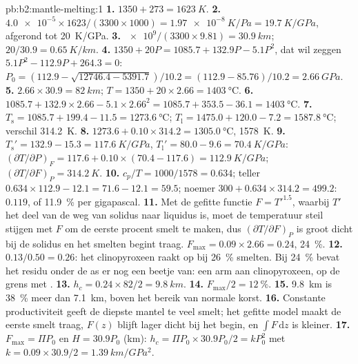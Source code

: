 \begin{solution}{pb:b2:mantle-melting:1}
\textbf{1.} $1350 + 273 = \qty{1623}{K}$.
\textbf{2.} $\num{4.0e-5}\times1623/(3300\times1000) = \qty{1.97e-8}{K/Pa} =
\qty{19.7}{K/GPa}$, afgerond tot \qty{20}{K/GPa}.
\textbf{3.} $\num{e9}/(3300\times9.81) = \qty{30.9}{km}$; $20/30.9 =
\qty{0.65}{K/km}$.
\textbf{4.} $1350 + 20P = 1085.7 + 132.9P - 5.1P^2$, dat wil zeggen $5.1P^2 - 112.9P +
264.3 = 0$: $P_0 = (112.9 - \sqrt{12746.4 - 5391.7})/10.2 = (112.9 - 85.76)/10.2 =
\qty{2.66}{GPa}$.
\textbf{5.} $2.66\times30.9 = \qty{82}{km}$; $T = 1350 + 20\times2.66 =
\qty{1403}{\celsius}$.
\textbf{6.} $1085.7 + 132.9\times2.66 - 5.1\times2.66^2 = 1085.7 + 353.5 - 36.1 =
\qty{1403}{\celsius}$.
\textbf{7.} $T_{\mathrm s} = 1085.7 + 199.4 - 11.5 = \qty{1273.6}{\celsius}$;
$T_{\mathrm l} = 1475.0 + 120.0 - 7.2 = \qty{1587.8}{\celsius}$; verschil
\qty{314.2}{K}.
\textbf{8.} $1273.6 + 0.10\times314.2 = \qty{1305.0}{\celsius}$, \qty{1578}{K}.
\textbf{9.} $T_{\mathrm s}' = 132.9 - 15.3 = \qty{117.6}{K/GPa}$, $T_{\mathrm l}' =
80.0 - 9.6 = \qty{70.4}{K/GPa}$: $(\partial T/\partial P)_F = 117.6 +
0.10\times(70.4 - 117.6) = \qty{112.9}{K/GPa}$; $(\partial T/\partial F)_P =
\qty{314.2}{K}$.
\textbf{10.} $c_p/T = 1000/1578 = 0.634$; teller $0.634\times112.9 - 12.1 = 71.6
- 12.1 = 59.5$; noemer $300 + 0.634\times314.2 = 499.2$: $0.119$, of
\qty{11.9}{\percent} per gigapascal.
\textbf{11.} Met de gefitte functie $F = T'^{1.5}$, waarbij $T'$ het deel van de weg van solidus naar liquidus is, moet de temperatuur steil stijgen met $F$ om
de eerste procent smelt te maken, dus $(\partial T/\partial F)_P$ is groot dicht bij de solidus
en het smelten begint traag. $F_{\max} = 0.09\times2.66 = 0.24$, \qty{24}{\percent}.
\textbf{12.} $0.13/0.50 = 0.26$: het clinopyroxeen raakt op bij \qty{26}{\percent}
smelten. Bij \qty{24}{\percent} bevat het residu onder de as er nog een beetje van:
een  arm aan clinopyroxeen, op de grens met .
\textbf{13.} $h_c = 0.24\times82/2 = \qty{9.8}{km}$.
\textbf{14.} $F_{\max}/2 = \qty{12}{\percent}$.
\textbf{15.} \qty{9.8}{km} is \qty{38}{\percent} meer dan \qty{7.1}{km}, boven het
bereik van normale korst.
\textbf{16.} Constante productiviteit geeft de diepste mantel te veel smelt; het
gefitte model maakt de eerste smelt traag, $F(z)$ blijft lager dicht bij het begin, en
$\int F\,\mathrm dz$ is kleiner.
\textbf{17.} $F_{\max} = \Pi P_0$ en $H = 30.9P_0$ (km): $h_c = \Pi P_0\times30.9P_0/2
= kP_0^2$ met $k = 0.09\times30.9/2 = \qty{1.39}{km/GPa^2}$.

\end{solution}
